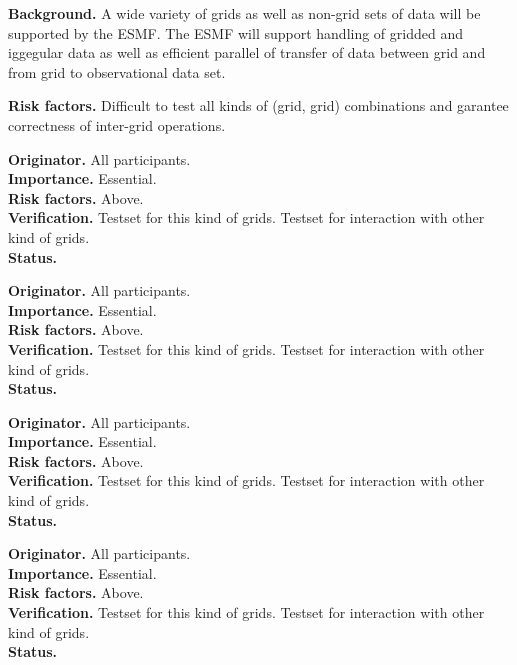 \begin{reqlist}
{\bf Background.} 
A wide variety of grids as well as non-grid sets of data will be supported by 
the ESMF. The ESMF will support handling of gridded and iggegular data as 
well as efficient parallel of transfer of data between grid and from grid to 
observational data set.

{\bf Risk factors.} Difficult to test all kinds of (grid, grid) combinations 
and garantee correctness of inter-grid operations.
\end{reqlist}

\begin{reqlist}
{\bf Originator.} All participants. \\
{\bf Importance.} Essential. \\
{\bf Risk factors.} Above. \\
{\bf Verification.} Testset for this kind of grids. Testset for interaction 
with other kind of grids. \\
{\bf Status.} 
\end{reqlist}
\begin{reqlist}
{\bf Originator.} All participants. \\
{\bf Importance.} Essential. \\
{\bf Risk factors.} Above. \\
{\bf Verification.} Testset for this kind of grids. Testset for interaction 
with other kind of grids. \\
{\bf Status.} 
\end{reqlist} 
\begin{reqlist}
{\bf Originator.} All participants. \\
{\bf Importance.} Essential. \\
{\bf Risk factors.} Above. \\
{\bf Verification.} Testset for this kind of grids. Testset for interaction 
with other kind of grids. \\
{\bf Status.} 
\end{reqlist} 
\begin{reqlist}
{\bf Originator.} All participants. \\
{\bf Importance.} Essential. \\
{\bf Risk factors.} Above. \\
{\bf Verification.} Testset for this kind of grids. Testset for interaction 
with other kind of grids. \\
{\bf Status.} 
\end{reqlist} 
